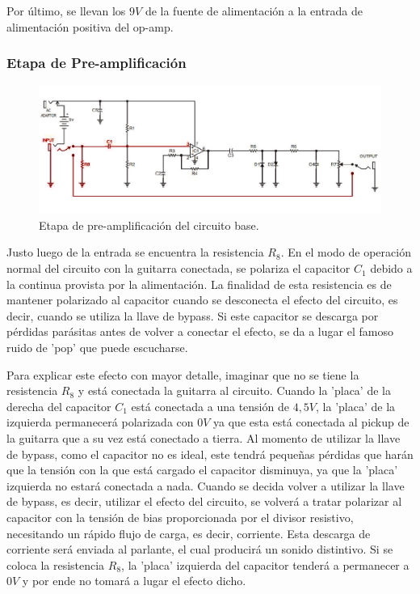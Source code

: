 Por último, se llevan los $9V$ de la fuente de alimentación a la entrada de alimentación positiva del op-amp.


\subsubsection{Etapa de Pre-amplificación}

\begin{figure}[H]
	\centering
	\includegraphics[width=1\textwidth, trim={0 0 0 0}, clip]{Ejercicio5/Imagenes/Circuito_base/circuito_base_preamplificacion.png}
	\caption{Etapa de pre-amplificación del circuito base.}
	\label{fig:circuito_base_preamplificacion}
\end{figure}

Justo luego de la entrada se encuentra la resistencia $R_8$. En el modo de operación normal del circuito con la guitarra conectada, se polariza el capacitor $C_1$ debido a la continua provista por la alimentación. La finalidad de esta resistencia es de mantener polarizado al capacitor cuando se desconecta el efecto del circuito, es decir, cuando se utiliza la llave de bypass. Si este capacitor se descarga por pérdidas parásitas antes de volver a conectar el efecto, se da a lugar el famoso ruido de 'pop' que puede escucharse.

Para explicar este efecto con mayor detalle, imaginar que no se tiene la resistencia $R_8$ y está conectada la guitarra al circuito. Cuando la 'placa' de la derecha del capacitor $C_1$ está conectada a una tensión de $4,5V$, la 'placa' de la izquierda permanecerá polarizada con $0V$ ya que esta está conectada al pickup de la guitarra que a su vez está conectado a tierra. Al momento de utilizar la llave de bypass, como el capacitor no es ideal, este tendrá pequeñas pérdidas que harán que la tensión con la que está cargado el capacitor disminuya, ya que la 'placa' izquierda no estará conectada a nada. Cuando se decida volver a utilizar la llave de bypass, es decir, utilizar el efecto del circuito, se volverá a tratar polarizar al capacitor con la tensión de bias proporcionada por el divisor resistivo, necesitando un rápido flujo de carga, es decir, corriente. Esta descarga de corriente será enviada al parlante, el cual producirá un sonido distintivo. Si se coloca la resistencia $R_8$, la 'placa' izquierda del capacitor tenderá a permanecer a $0V$ y por ende no tomará a lugar el efecto dicho.

